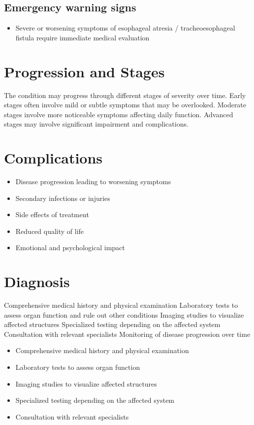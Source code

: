 \subsection{Emergency warning signs}
\begin{itemize}[noitemsep]
  \item Severe or worsening symptoms of esophageal atresia / tracheoesophageal fistula require immediate medical evaluation
\end{itemize}
\section{Progression and Stages}
The condition may progress through different stages of severity over time. Early stages often involve mild or subtle symptoms that may be overlooked. Moderate stages involve more noticeable symptoms affecting daily function. Advanced stages may involve significant impairment and complications.
\section{Complications}
\begin{itemize}[noitemsep]
  \item Disease progression leading to worsening symptoms
  \item Secondary infections or injuries
  \item Side effects of treatment
  \item Reduced quality of life
  \item Emotional and psychological impact
\end{itemize}
\section{Diagnosis}
Comprehensive medical history and physical examination Laboratory tests to assess organ function and rule out other conditions Imaging studies to visualize affected structures Specialized testing depending on the affected system Consultation with relevant specialists Monitoring of disease progression over time

\begin{itemize}[noitemsep]
  \item Comprehensive medical history and physical examination
  \item Laboratory tests to assess organ function
  \item Imaging studies to visualize affected structures
  \item Specialized testing depending on the affected system
  \item Consultation with relevant specialists
\end{itemize}

